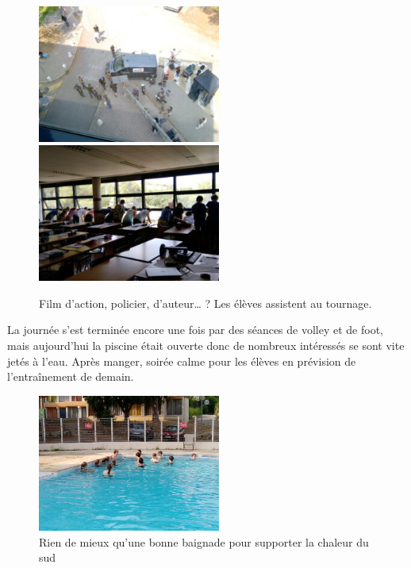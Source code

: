 \begin{figure}[H]
\centering\includegraphics[width=6cm]{CR-23-2.jpg}\hspace{2cm}\includegraphics[width=6cm]{CR-23-3.jpg}
\caption{Film d’action, policier, d’auteur… ? Les élèves assistent au tournage.}
\end{figure}

La journée s’est terminée encore une fois par des séances de volley et de foot, mais aujourd’hui la piscine était ouverte donc de nombreux intéressés se sont vite jetés à l’eau. Après manger, soirée calme pour les élèves en prévision de l’entraînement de demain.

\begin{figure}[H]
\centering\includegraphics[width=6cm]{CR-23-4.jpg}
\caption{Rien de mieux qu’une bonne baignade pour supporter la chaleur du sud}
\end{figure}
